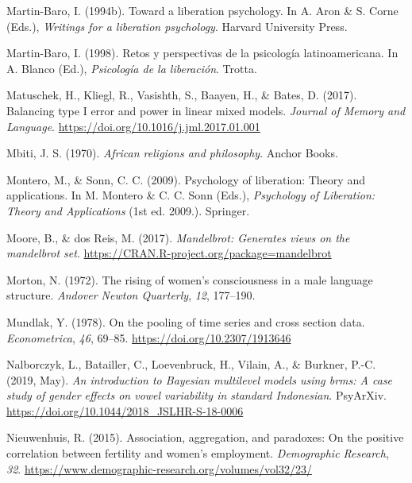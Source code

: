 \documentclass[
  letterpaper,
  DIV=11,
  numbers=noendperiod]{scrreprt}
\newlength{\cslhangindent}
\newenvironment{CSLReferences}[2] %
 {\begin{list}{}{%
  \setlength{\itemindent}{0pt}
  \setlength{\leftmargin}{0pt}
  \setlength{\parsep}{0pt}
  \ifodd #1
   \setlength{\leftmargin}{\cslhangindent}
   \setlength{\itemindent}{-1\cslhangindent}
  \fi
  \setlength{\itemsep}{#2\baselineskip}}}
 {\end{list}}
\begin{document}
\begin{CSLReferences}{1}{0}
Martin-Baro, I. (1994b). Toward a liberation psychology. In A. Aron \&
S. Corne (Eds.), \emph{Writings for a liberation psychology}. Harvard
University Press.

Martin-Baro, I. (1998). {Retos y perspectivas de la psicología
latinoamericana}. In A. Blanco (Ed.), \emph{Psicología de la
liberación}. Trotta.

Matuschek, H., Kliegl, R., Vasishth, S., Baayen, H., \& Bates, D.
(2017). Balancing type {I} error and power in linear mixed models.
\emph{Journal of Memory and Language}.
\url{https://doi.org/10.1016/j.jml.2017.01.001}

Mbiti, J. S. (1970). \emph{African religions and philosophy}. Anchor
Books.

Montero, M., \& Sonn, C. C. (2009). Psychology of liberation: Theory and
applications. In M. Montero \& C. C. Sonn (Eds.), \emph{Psychology of
Liberation: Theory and Applications} (1st ed. 2009.). Springer.

Moore, B., \& dos Reis, M. (2017). \emph{Mandelbrot: Generates views on
the mandelbrot set}. \url{https://CRAN.R-project.org/package=mandelbrot}

Morton, N. (1972). The rising of women's consciousness in a male
language structure. \emph{Andover Newton Quarterly}, \emph{12},
177--190.

Mundlak, Y. (1978). On the pooling of time series and cross section
data. \emph{Econometrica}, \emph{46}, 69--85.
\url{https://doi.org/10.2307/1913646}

Nalborczyk, L., Batailler, C., Loevenbruck, H., Vilain, A., \& Burkner,
P.-C. (2019, May). \emph{An introduction to {B}ayesian multilevel models
using brms: A case study of gender effects on vowel variability in
standard {I}ndonesian}. PsyArXiv.
\url{https://doi.org/10.1044/2018_JSLHR-S-18-0006}

Nieuwenhuis, R. (2015). Association, aggregation, and paradoxes: On the
positive correlation between fertility and women's employment.
\emph{Demographic Research}, \emph{32}.
\url{https://www.demographic-research.org/volumes/vol32/23/}


\end{CSLReferences}
\end{document}
